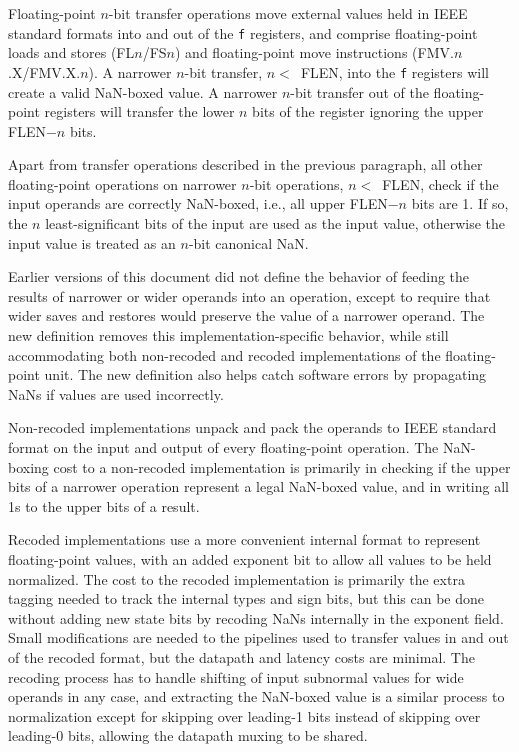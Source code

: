 Floating-point $n$-bit transfer operations move external values held
in IEEE standard formats into and out of the {\tt f} registers, and
comprise floating-point loads and stores (FL$n$/FS$n$) and
floating-point move instructions (FMV.$n$.X/FMV.X.$n$).  A narrower
$n$-bit transfer, \mbox{$n<$ FLEN}, into the {\tt f} registers will create a
valid NaN-boxed value.  A narrower $n$-bit transfer out of
the floating-point registers will transfer the lower $n$ bits of the
register ignoring the upper FLEN$-n$ bits.

Apart from transfer operations described in the previous paragraph,
all other floating-point operations on narrower $n$-bit operations,
\mbox{$n<$ FLEN}, check if the input operands are correctly NaN-boxed,
i.e., all upper FLEN$-n$ bits are 1.  If so, the $n$ least-significant
bits of the input are used as the input value, otherwise the input
value is treated as an $n$-bit canonical NaN.

\begin{commentary}
Earlier versions of this document did not define the behavior of
feeding the results of narrower or wider operands into an operation,
except to require that wider saves and restores would preserve the
value of a narrower operand.  The new definition removes this
implementation-specific behavior, while still accommodating both
non-recoded and recoded implementations of the floating-point unit.
The new definition also helps catch software errors by propagating
NaNs if values are used incorrectly.

Non-recoded implementations unpack and pack the operands to IEEE
standard format on the input and output of every floating-point
operation.  The NaN-boxing cost to a non-recoded implementation is
primarily in checking if the upper bits of a narrower operation
represent a legal NaN-boxed value, and in writing all 1s to the upper
bits of a result.

Recoded implementations use a more convenient internal format to
represent floating-point values, with an added exponent bit to allow
all values to be held normalized.  The cost to the recoded
implementation is primarily the extra tagging needed to track the
internal types and sign bits, but this can be done without adding new
state bits by recoding NaNs internally in the exponent field.  Small
modifications are needed to the pipelines used to transfer values in
and out of the recoded format, but the datapath and latency costs are
minimal.  The recoding process has to handle shifting of input
subnormal values for wide operands in any case, and extracting the
NaN-boxed value is a similar process to normalization except for
skipping over leading-1 bits instead of skipping over leading-0 bits,
allowing the datapath muxing to be shared.
\end{commentary}

